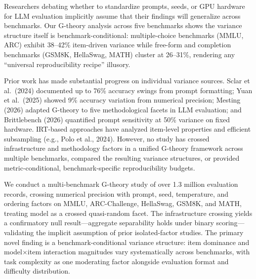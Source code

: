 \documentclass[11pt]{article}
\begin{document}
Researchers debating whether to standardize prompts, seeds, or GPU hardware for LLM evaluation implicitly assume that their findings will generalize across benchmarks.
Our G-theory analysis across five benchmarks shows the variance structure itself is benchmark-conditional: multiple-choice benchmarks (MMLU, ARC) exhibit 38--42\% item-driven variance while free-form and completion benchmarks (GSM8K, HellaSwag, MATH) cluster at 26--31\%, rendering any ``universal reproducibility recipe'' illusory.

Prior work has made substantial progress on individual variance sources.
Sclar et al.\ (2024) documented up to 76\% accuracy swings from prompt formatting; Yuan et al.\ (2025) showed 9\% accuracy variation from numerical precision; Mesting (2026) adapted G-theory to five methodological facets in LLM evaluation; and Brittlebench (2026) quantified prompt sensitivity at 50\% variance on fixed hardware.
IRT-based approaches have analyzed item-level properties and efficient subsampling (e.g., Polo et al., 2024).
However, no study has crossed infrastructure and methodology factors in a unified G-theory framework across multiple benchmarks, compared the resulting variance structures, or provided metric-conditional, benchmark-specific reproducibility budgets.

We conduct a multi-benchmark G-theory study of over 1.3 million evaluation records, crossing numerical precision with prompt, seed, temperature, and ordering factors on MMLU, ARC-Challenge, HellaSwag, GSM8K, and MATH, treating model as a crossed quasi-random facet.
The infrastructure crossing yields a confirmatory null result---aggregate separability holds under binary scoring---validating the implicit assumption of prior isolated-factor studies.
The primary novel finding is a benchmark-conditional variance structure: item dominance and model$\times$item interaction magnitudes vary systematically across benchmarks, with task complexity as one moderating factor alongside evaluation format and difficulty distribution.
\end{document}
